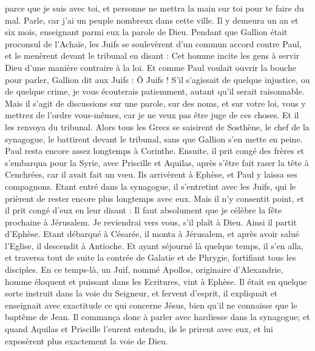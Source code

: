 \begin{multicols}{2}
parce que je suis avec toi, et personne ne mettra la main sur toi pour te faire du mal. Parle, car j'ai un peuple nombreux dans cette ville.
Il y demeura un an et six mois, enseignant parmi eux la parole de Dieu.
Pendant que Gallion était proconsul de l'Achaïe, les Juifs se soulevèrent d'un commun accord contre Paul, et le menèrent devant le tribunal
en disant : Cet homme incite les gens à servir Dieu d'une manière contraire à la loi.
Et comme Paul voulait ouvrir la bouche pour parler, Gallion dit aux Juifs : Ô Juifs ! S'il s'agissait de quelque injustice, ou de quelque crime, je vous écouterais patiemment, autant qu'il serait raisonnable.
Mais il s'agit de discussions sur une parole, sur des noms, et sur votre loi, vous y mettrez de l'ordre vous-mêmes, car je ne veux pas être juge de ces choses.
Et il les renvoya du tribunal.
Alors tous les Grecs se saisirent de Sosthène, le chef de la synagogue, le battirent devant le tribunal, sans que Gallion s'en mette en peine.
Paul resta encore assez longtemps à Corinthe. Ensuite, il prit congé des frères et s'embarqua pour la Syrie, avec Priscille et Aquilas, après s'être fait raser la tête à Cenchrées, car il avait fait un vœu.
Ils arrivèrent à Ephèse, et Paul y laissa ses compagnons. Etant entré dans la synagogue, il s'entretint avec les Juifs,
qui le prièrent de rester encore plus longtemps avec eux.
Mais il n'y consentit point, et il prit congé d'eux en leur disant : Il faut absolument que je célèbre la fête prochaine à Jérusalem. Je reviendrai vers vous, s'il plaît à Dieu. Ainsi il partit d'Ephèse.
Etant débarqué à Césarée, il monta à Jérusalem, et après avoir salué l'Eglise, il descendit à Antioche.
Et ayant séjourné là quelque temps, il s'en alla, et traversa tout de suite la contrée de Galatie et de Phrygie, fortifiant tous les disciples.
En ce temps-là, un Juif, nommé Apollos, originaire d'Alexandrie, homme éloquent et puissant dans les Ecritures, vint à Ephèse.
Il était en quelque sorte instruit dans la voie du Seigneur, et fervent d'esprit, il expliquait et enseignait avec exactitude ce qui concerne Jésus, bien qu'il ne connaisse que le baptême de Jean.
Il commança donc à parler avec hardiesse dans la synagogue; et quand Aquilas et Priscille l'eurent entendu, ils le prirent avec eux, et lui exposèrent plus exactement la voie de Dieu.

\end{multicols}
